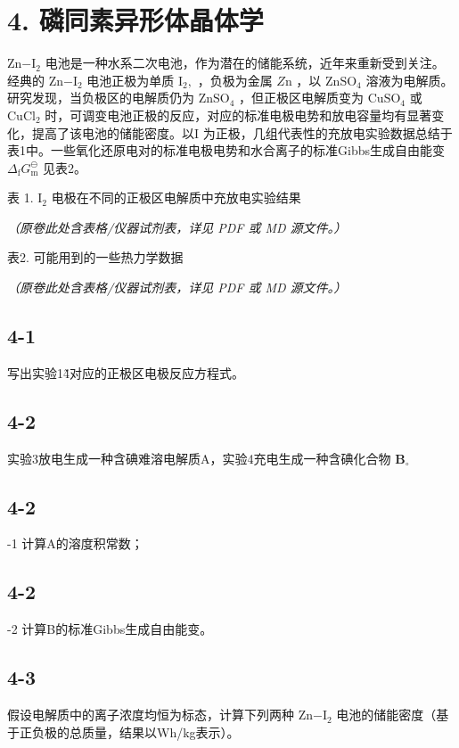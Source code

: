 \section*{4. 磷同素异形体晶体学}
$\mathrm { Z n \mathrm { - } I _ { 2 } }$ 电池是⼀种⽔系⼆次电池，作为潜在的储能系统，近年来重新受到关注。经典的 $\mathrm { Z n \mathrm { - } I _ { 2 } }$ 电池正极为单质 $\mathrm { I } _ { 2 } ,$ ，负极为⾦属 $Z \mathrm { n }$ ，以 $\mathrm { Z n S O _ { 4 } }$ 溶液为电解质。研究发现，当负极区的电解质仍为 $\mathrm { Z n S O _ { 4 } }$ ，但正极区电解质变为 $\mathrm { C u S O _ { 4 } }$ 或 $\mathrm { C u C l _ { 2 } }$ 时，可调变电池正极的反应，对应的标准电极电势和放电容量均有显著变化，提⾼了该电池的储能密度。以I 为正极，⼏组代表性的充放电实验数据总结于表1中。⼀些氧化还原电对的标准电极电势和⽔合离⼦的标准Gibbs⽣成⾃由能变 $\Delta _ { \mathrm { f } } G _ { \mathrm { m } } ^ { \ominus }$ ⻅表2。

表 1. $\mathrm { I } _ { 2 }$ 电极在不同的正极区电解质中充放电实验结果

\textit{（原卷此处含表格/仪器试剂表，详见 PDF 或 MD 源文件。）}

表2. 可能⽤到的⼀些热⼒学数据

\textit{（原卷此处含表格/仪器试剂表，详见 PDF 或 MD 源文件。）}

\subsection*{4-1}
写出实验1\~4对应的正极区电极反应⽅程式。

\subsection*{4-2}
实验3放电⽣成⼀种含碘难溶电解质A，实验4充电⽣成⼀种含碘化合物 $\mathbf { B } _ { \circ }$

\subsection*{4-2}
-1 计算A的溶度积常数；

\subsection*{4-2}
-2 计算B的标准Gibbs⽣成⾃由能变。

\subsection*{4-3}
假设电解质中的离⼦浓度均恒为标态，计算下列两种 $\mathrm { Z n \mathrm { - } I _ { 2 } }$ 电池的储能密度（基于正负极的总质量，结果以Wh/kg表⽰）。

